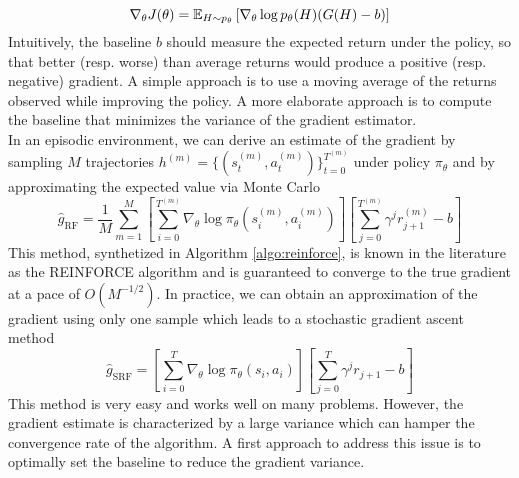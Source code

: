 \begin{equation}
\label{eq:gradient_MC_baseline}
	\nabla_\theta J(\theta) = \E[H \sim p_\theta]{\nabla_\theta \log p_\theta(H)(G(H)-b)}
\end{equation}
Intuitively, the baseline $b$ should measure the expected return under the policy, so that better (resp. worse) than average returns would produce a positive (resp. negative) gradient. A simple approach is to use a moving average of the returns observed while improving the policy. A more elaborate approach is to compute the baseline that minimizes the variance of the gradient estimator.\\
In an episodic environment, we can derive an estimate of the gradient by sampling $M$ trajectories $h^{(m)} = \{(s_t^{(m)}, a_t^{(m)})\}_{t = 0}^{T^{(m)}}$ under policy $\pi_\theta$ and by approximating the expected value via Monte Carlo
\begin{equation}
\label{eq:reinforce_gradient}
	\widehat{g}_{\text{RF}} = \frac{1}{M} \sum^{M}_{m=1} \left[ \sum_{i=0}^{T^{(m)}} 
	\nabla_\theta \log \pi_\theta(s_i^{(m)}, a_i^{(m)}) \right] \left[
	\sum^{T^{(m)}}_{j=0} \gamma^j r_{j+1}^{(m)} - b \right]  
\end{equation}
This method, synthetized in Algorithm \ref{algo:reinforce}, is known in the literature as the REINFORCE algorithm and is guaranteed to converge to the true gradient at a pace of $O(M^{-1/2})$. In practice, we can obtain an approximation of the gradient using only one sample which leads to a stochastic gradient ascent method
\begin{equation}
	\widehat{g}_{\text{SRF}} = \left[ \sum_{i=0}^{T} \nabla_\theta \log \pi_\theta(s_i, 
	a_i) \right] \left[ \sum^{T}_{j=0} \gamma^j r_{j+1} - b \right]  
\end{equation}
This method is very easy and works well on many problems. However, the gradient
estimate is characterized by a large variance which can hamper the convergence
rate of the algorithm. A first approach to address this issue is to optimally
set the baseline to reduce the gradient variance.

